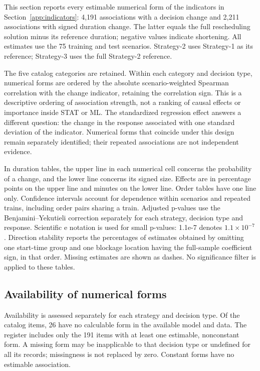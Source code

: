 \label{app:association-results}

This section reports every estimable numerical form of the indicators in Section~\ref{app:indicators}: 4,191 associations with a decision change and 2,211 associations with signed duration change. The latter equals the full rescheduling solution minus its reference duration; negative values indicate shortening. All estimates use the 75 training and test scenarios. Strategy-2 uses Strategy-1 as its reference; Strategy-3 uses the full Strategy-2 reference.

The five catalog categories are retained. Within each category and decision type, numerical forms are ordered by the absolute scenario-weighted Spearman correlation with the change indicator, retaining the correlation sign. This is a descriptive ordering of association strength, not a ranking of causal effects or importance inside STAT or ML. The standardized regression effect answers a different question: the change in the response associated with one standard deviation of the indicator. Numerical forms that coincide under this design remain separately identified; their repeated associations are not independent evidence.

In duration tables, the upper line in each numerical cell concerns the probability of a change, and the lower line concerns its signed size. Effects are in percentage points on the upper line and minutes on the lower line. Order tables have one line only. Confidence intervals account for dependence within scenarios and repeated trains, including order pairs sharing a train. Adjusted p-values use the Benjamini--Yekutieli correction separately for each strategy, decision type and response. Scientific e notation is used for small p-values: 1.1e-7 denotes $1.1\times10^{-7}$. Direction stability reports the percentages of estimates obtained by omitting one start-time group and one blockage location having the full-sample coefficient sign, in that order. Missing estimates are shown as dashes. No significance filter is applied to these tables.

\subsection{Availability of numerical forms}

Availability is assessed separately for each strategy and decision type. Of the catalog items, 26 have no calculable form in the available model and data. The register includes only the 191 items with at least one estimable, nonconstant form. A missing form may be inapplicable to that decision type or undefined for all its records; missingness is not replaced by zero. Constant forms have no estimable association.

